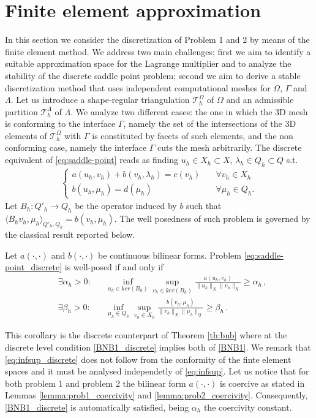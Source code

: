 \section{Finite element approximation}
In this section we consider the discretization of Problem 1 and 2 by means of the finite element method. We address two main challenges; first we aim to identify a suitable approximation space for the Lagrange multiplier and to analyze the stability of the discrete saddle point problem; second we aim to derive a stable discretization method that uses independent computational meshes for $\Omega$, $\Gamma$ and $\Lambda$. Let us introduce a shape-regular triangulation $\mathcal{T}^{\Omega}_h$ of $\Omega$ and an admissible partition $\mathcal{T}^{\Lambda}_{h}$ of $\Lambda$.
We analyze two different cases: the one in which the 3D mesh is conforming to the interface $\Gamma$, namely the set of the intersections of the 3D elements of $\mathcal{T}^{\Omega}_h$ with $\Gamma$ is constituted by facets of such elements, and the non conforming case, namely the interface $\Gamma$ cuts the mesh arbitrarily. The discrete equivalent of \eqref{eq:saddle-point} reads as finding $u_h\in X_h\subset X$, $\lambda_h\in Q_h\subset Q$ s.t.
\begin{eqnarray}\label{eq:saddle-point_discrete}
\begin{cases}
a(u_h,v_h)+b(v_h,\lambda_h)=c(v_h)\quad &\forall v_h\in X_h\\
b(u_h,\mu_h)=d(\mu_h) \quad &\forall \mu_h\in Q_h.
\end{cases}
\end{eqnarray}
Let $B_h: Q'_h \longrightarrow Q_h$ be the operator induced by $b$ such that $\langle B_h v_h,\mu _h\rangle_{Q'_h,Q_h} = b(v_h,\mu _h)$.
The well posedness of such problem is governed by the classical result reported below.

\begin{corollary}{\cite[Theorem 2.42]{MR2050138}}Let $a(\cdot, \cdot)$ and $b(\cdot, \cdot)$ be continuous bilinear forms. 
Problem \eqref{eq:saddle-point_discrete} is well-posed if and only if 
\begin{align}\label{BNB1_discrete}
& \exists \alpha_h >0 : && \inf_{u_h\in ker(B_h)}\sup_{v_h\in ker(B_h)} \frac{a(u_h,v_h)}{\|u_h\|_{X}\|v_h\|_{X}}\geq \alpha_h\,,
\\
\label{eq:infsup_discrete}
 &\exists \beta_h >0: &&\inf_{\mu_h\in Q_h}\sup_{v_h\in X_h} \frac{b(v_h,\mu_h)}{\|v_h\|_{X}\|\mu_h\|_{Q}}\geq \beta_h\, .
\end{align}
\end{corollary}
This corollary is the discrete counterpart of Theorem \ref{th:bnb} where at the discrete level condition \eqref{BNB1_discrete} implies both of \eqref{BNB1}. We remark that \eqref{eq:infsup_discrete} does not follow from the conformity of the finte element spaces and it must be analysed independetly of \eqref{eq:infsup}.  
Let us notice that for both problem 1 and problem 2 the bilinear form $a(\cdot, \cdot)$ is coercive as stated in Lemmas \eqref{lemma:prob1_coercivity} and \eqref{lemma:prob2_coercivity}. Consequently, \eqref{BNB1_discrete} is automatically satisfied, being $\alpha_h$ the coercivity constant.\\

